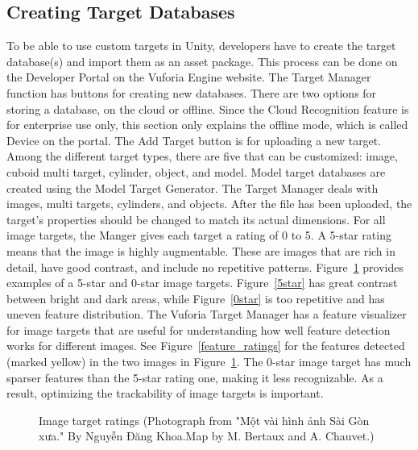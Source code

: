 \subsection{Creating Target Databases}
To be able to use custom targets in Unity, developers have to create the target database(s) and import them as an asset package. This process can be done on the Developer Portal on the Vuforia Engine website. The Target Manager function has buttons for creating new databases. There are two options for storing a database, on the cloud or offline. Since the Cloud Recognition feature is for enterprise use only, this section only explains the offline mode, which is called Device on the portal. The Add Target button is for uploading a new target. Among the different target types, there are five that can be customized: image, cuboid multi target, cylinder, object, and model. Model target databases are created using the Model Target Generator. The Target Manager deals with images, multi targets, cylinders, and objects. After the file has been uploaded, the target's properties should be changed to match its actual dimensions. For all image targets, the Manger gives each target a rating of 0 to 5. A 5-star rating means that the image is highly augmentable. These are images that are rich in detail, have good contrast, and include no repetitive patterns. Figure~\ref{ratings} provides examples of a 5-star and 0-star image targets. Figure~\ref{5star} has great contrast between bright and dark areas, while Figure~\ref{0star} is too repetitive and has uneven feature distribution. The Vuforia Target Manager has a feature visualizer for image targets that are useful for understanding how well feature detection works for different images. See Figure~\ref{feature_ratings} for the features detected (marked yellow) in the two images in Figure~\ref{ratings}. The 0-star image target has much sparser features than the 5-star rating one, making it less recognizable. As a result, optimizing the trackability of image targets is important.

\begin{figure}[!ht]\centering
{}
\qquad
{}
\vspace{-.2 in}
\caption[Image target ratings]{Image target ratings (\vi Photograph from "Một vài hình ảnh Sài Gòn xưa." By Nguyễn Đăng Khoa.\footnotemark Map by M. Bertaux and A. Chauvet.\footnotemark)}\label{ratings}
\end{figure}

